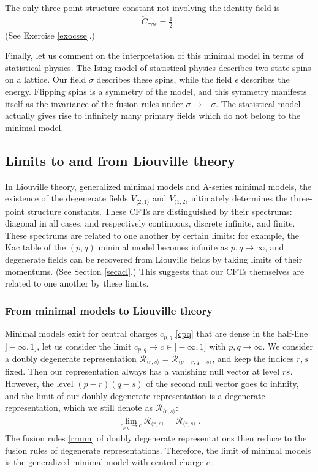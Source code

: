 \documentclass[12pt, a4paper, notitlepage, twoside]{report}
\numberwithin{equation}{section}
\theoremstyle{break}
\begin{document}
The only three-point structure constant not involving the identity field is 
\begin{align}
 \check{C}_{\sigma\sigma\epsilon} =\frac12\ .
\label{csse}
\end{align}
(See Exercise \ref{exocsse}.)

Finally, let us comment on the interpretation of this minimal model in terms of statistical physics.
The Ising model of statistical physics describes two-state spins on a lattice.
Our field $\sigma$ describes these spins, while the field $\epsilon$ describes the energy.
Flipping spins is a symmetry of the model, and this symmetry manifests itself as the invariance of the fusion rules under $\sigma\to -\sigma$. The statistical model actually gives rise to infinitely many primary fields which do not belong to the minimal model.

\subsection{Limits to and from Liouville theory}\label{secltf}

In Liouville theory, generalized minimal models and A-series minimal models, the existence of the degenerate fields $V_{\langle 2,1\rangle}$ and $V_{\langle 1,2\rangle}$ ultimately determines the three-point structure constants. These CFTs are distinguished by their spectrums: diagonal in all cases, and respectively continuous, discrete infinite, and finite. These spectrums are related to one another by certain limits: for example, the Kac table of the $(p, q)$ minimal model becomes infinite as $p,q\to \infty$, and degenerate fields can be recovered from Liouville fields by taking limits of their momentums. (See Section \ref{secacl}.) This suggests that our CFTs themselves are related to one another by these limits. 

\subsubsection{From minimal models to Liouville theory}

Minimal models exist for central charges $c_{p,q}$ \eqref{cpq} that are dense in the half-line $]-\infty, 1]$, let us consider the limit $c_{p, q}\to c\in ]-\infty, 1]$ with $p,q\to\infty$.
We consider a doubly degenerate representation $\mathcal{R}_{\langle r,s\rangle}=\mathcal{R}_{\langle p-r,q-s\rangle}$, and keep the indices $r,s$ fixed. 
Then our representation always has a vanishing null vector at level $rs$. However, the level $(p-r)(q-s)$ of the second null vector goes to infinity, and the limit of our doubly degenerate representation is a degenerate representation, which we still denote as $\mathcal{R}_{\langle r,s\rangle}$:
 \begin{align}
  \lim_{c_{p,q}\to c} \mathcal{R}_{\langle r,s\rangle} = \mathcal{R}_{\langle r,s\rangle} \ .
 \end{align}
The fusion rules \eqref{rrmm} of doubly degenerate representations then reduce to the fusion rules of degenerate representations. Therefore, the limit of minimal models is the generalized minimal model with central charge $c$. 
\end{document}
